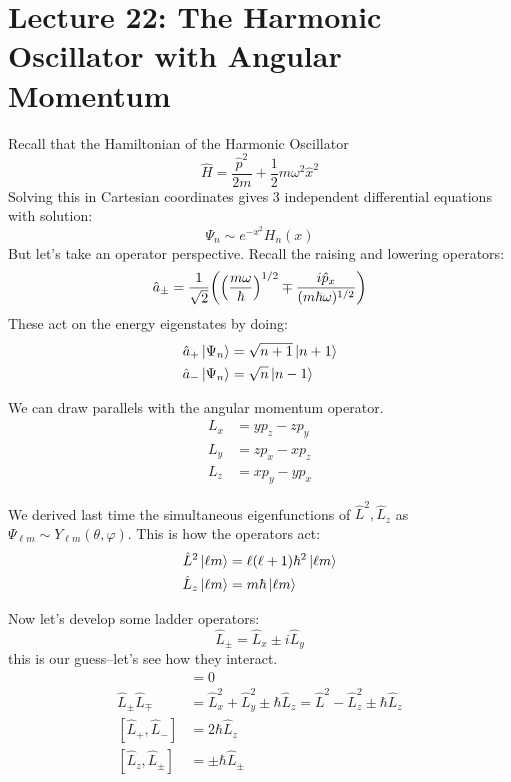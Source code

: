 \section{Lecture 22: The Harmonic Oscillator with Angular Momentum} 

Recall that the Hamiltonian of the Harmonic Oscillator
\[ \hat{H} = \frac{\hat{p}^2}{2m} + \frac{1}{2} m \omega^2 \hat{x}^2 \]
Solving this in Cartesian coordinates gives 3 independent differential equations with solution:
\[ \Psi_n \sim e^{-x^2} H_n(x) \]
But let's take an operator perspective. Recall the raising and lowering operators:
\[ \hat{a}_{\pm} = \frac{1}{\sqrt{2}} \qty(\qty(\frac{m\omega}{\hbar})^{1/2} \mp \frac{i \hat{p}_x}{(m \hbar \omega)^{1/2}}) \]
These act on the energy eigenstates by doing:
\begin{align*}
    \hat{a}_{+} \ket{\Psi_n} &= \sqrt{n + 1} \ket{n + 1} \\
    \hat{a}_{-} \ket{\Psi_n} &= \sqrt{n} \ket{n - 1}
\end{align*}

We can draw parallels with the angular momentum operator.
\begin{align*}
    L_x &= y p_z - z p_y \\
    L_y &= z p_x - x p_z \\
    L_z &= x p_y - y p_x
\end{align*}

We derived last time the simultaneous eigenfunctions of $ \hat{L}^2, \hat{L}_z $
as $\Psi_{\ell m} \sim Y_{\ell m}(\theta, \varphi)$. This is how the operators act:
\begin{align*}
    \hat{L}^2 \ket{\ell m} &= \ell (\ell + 1) \hbar^2 \ket{\ell m} \\
    \hat{L}_z \ket{\ell m} &= m \hbar \ket{\ell m}
\end{align*}

Now let's develop some ladder operators:
\[ \hat{L}_{\pm} = \hat{L}_x \pm i \hat{L}_y \]
this is our guess--let's see how they interact.
\begin{align*}
    [\hat{L}^2, \hat{L}_{\pm}] &= 0 \\
    \hat{L}_{\pm} \hat{L}_{\mp} &= \hat{L}_x^2 + \hat{L}_y^2 \pm \hbar \hat{L}_z = \hat{L}^2 - \hat{L}_z^2 \pm \hbar \hat{L}_z \\
    [\hat{L}_+, \hat{L}_{-}] &= 2\hbar \hat{L}_z \\
    [\hat{L}_z, \hat{L}_{\pm}] &= \pm \hbar \hat{L}_{\pm} \\
\end{align*}

